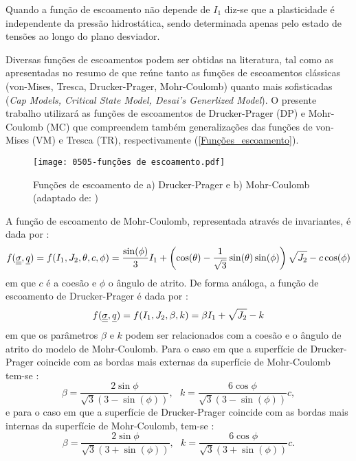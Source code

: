 Quando a função de escoamento não depende de $I_1$   diz-se que a plasticidade é independente da pressão hidrostática, sendo determinada apenas pelo estado de tensões ao longo do plano desviador.

Diversas funções de escoamentos podem ser obtidas na literatura, tal como as apresentadas no resumo de  que reúne tanto as funções de escoamentos clássicas (von-Mises, Tresca, Drucker-Prager, Mohr-Coulomb) quanto mais sofisticadas (\textit{Cap Models, Critical State Model, Desai’s Generlized Model}). O presente trabalho utilizará as funções de escoamentos de Drucker-Prager (DP) e Mohr-Coulomb (MC) que compreendem também generalizações das funções de von-Mises (VM) e Tresca (TR), respectivamente (\autoref{Funções_escoamento}).
\begin{figure}[H]
	\begin{center}
		\texttt{[image: 0505-funções de escoamento.pdf]}
	\end{center}
	\caption{\label{Funções_escoamento}Funções de escoamento de a) Drucker-Prager e b) Mohr-Coulomb  (adaptado de: )}
\end{figure}
A função de escoamento de Mohr-Coulomb, representada através de invariantes, é dada por \cite[p. 166]{Neto2008}:
\begin{equation}
	\label{eq:f_Mohr_Coulomb}
	f(\underline{\underline \sigma},\underline q) = f(I_1,J_2,\theta,c,\phi) = \dfrac{\sin(\phi)}{3}I_1 + \left(\cos(\theta)-\dfrac{1}{\sqrt{3}}\sin(\theta)\sin(\phi)\right)\sqrt{J_2}-c\cos(\phi) 
\end{equation}
em que $c$ é a coesão e $\phi$ o ângulo de atrito. De forma análoga, a função de escoamento de Drucker-Prager é dada por \cite[p. 167]{Neto2008}:
\begin{equation}
	\label{eq:f_Drucker_Prager}
	f(\underline{\underline \sigma},\underline q) = f(I_1,J_2,\beta,k) = \beta I_1 +\sqrt{J_2}-k
\end{equation}
em que os parâmetros $\beta$ e $k$ podem ser relacionados com a coesão e o ângulo de atrito do modelo de Mohr-Coulomb. Para o caso em que a superfície de Drucker-Prager coincide com as bordas mais externas da superfície de Mohr-Coulomb tem-se \cite[p. 167]{Neto2008}:
\begin{equation}
	\label{eq:f_DP_bordasexternas_MC}
	\beta = \dfrac{2\sin{\phi}}{\sqrt{3}(3-\sin(\phi))}, ~~~ k = \dfrac{6\cos{\phi}}{\sqrt{3}(3-\sin(\phi))}c,
\end{equation}
e para o caso em que a superfície de Drucker-Prager coincide com as bordas mais internas da superfície de Mohr-Coulomb, tem-se \cite[p. 167]{Neto2008}:
\begin{equation}
	\label{eq:f_DP_bordasinternas_MC}
	\beta = \dfrac{2\sin{\phi}}{\sqrt{3}(3+\sin(\phi))}, ~~~ k = \dfrac{6\cos{\phi}}{\sqrt{3}(3+\sin(\phi))}c.
\end{equation}

